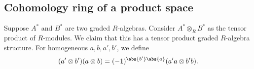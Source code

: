 \documentclass{standalone}
\begin{document}
\subsection{Cohomology ring of a product space}
Suppose \(A^*\) and \(B^*\) are two graded \(R\)-algebras.
Consider \(A^* \otimes_R B^*\) as the tensor product of \(R\)-modules.
We claim that this has a tensor product graded \(R\)-algebra structure.
For homogeneous \(a, b, a', b'\), we define
\[
  (a' \otimes b') (a \otimes b) = (-1)^{\abs{b'}\abs{a}} (a' a \otimes b' b).
\]







\end{document}
